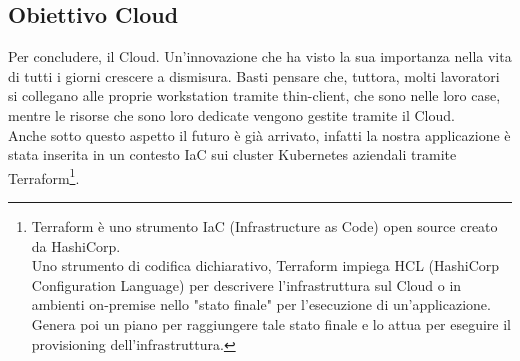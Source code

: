 \subsection{Obiettivo Cloud}
Per concludere, il Cloud.
Un'innovazione che ha visto la sua importanza nella vita di tutti i giorni crescere a dismisura. Basti pensare che, tuttora, molti lavoratori si collegano alle proprie workstation tramite thin-client, che sono nelle loro case, mentre le risorse che sono loro dedicate vengono gestite tramite il Cloud.
\\
Anche sotto questo aspetto il futuro è già arrivato, infatti la nostra applicazione è stata inserita in un contesto IaC sui cluster Kubernetes aziendali tramite Terraform\footnote{
Terraform è uno strumento IaC (Infrastructure as Code) open source creato da HashiCorp.
\\
Uno strumento di codifica dichiarativo, Terraform impiega HCL (HashiCorp Configuration Language) per descrivere l'infrastruttura sul Cloud o in ambienti on-premise nello "stato finale" per l'esecuzione di un'applicazione. Genera poi un piano per raggiungere tale stato finale e lo attua per eseguire il provisioning dell'infrastruttura.\cite{TerraformDef}
}.